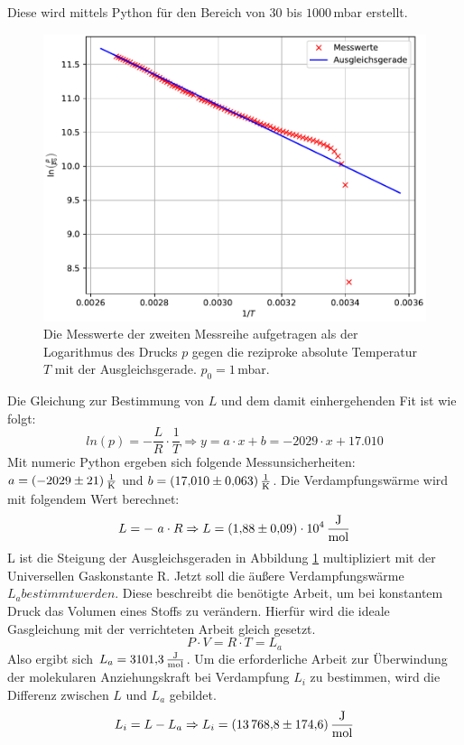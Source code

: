 Diese wird mittels Python für den Bereich von $30$ bis $1000$\,mbar erstellt. \\
\begin{figure}[H]
  \centering
  \includegraphics[scale=0.5]{plotc.pdf}
  \caption{Die Messwerte der zweiten Messreihe aufgetragen als der Logarithmus des Drucks $p$
  gegen die reziproke absolute Temperatur $T$ mit der Ausgleichsgerade. $p_0=1$\,mbar.}
  \label{fig:Ausgleichsgerade}
\end{figure}
\newpage
Die Gleichung zur Bestimmung von $L$ und dem damit einhergehenden Fit ist wie folgt:
\begin{equation}
  ln(p) = - \frac{L}{R} \cdot \frac{1}{T}
  \Rightarrow y = a \cdot x + b = -2029 \cdot x + 17.010
\end{equation}
Mit numeric Python ergeben sich folgende Messunsicherheiten: $a = \SI{-2029 \pm 21 }{\frac{1}{\kelvin}}$
und $b = \SI{17.010 \pm 0.063}{\frac{1}{\kelvin}}$.
Die Verdampfungswärme wird mit folgendem Wert berechnet:
\begin{equation*}
  L = - \ a \cdot R \Rightarrow L = \SI{1.88 +- 0.09e4}{\frac{\J}{\mol}}
\end{equation*}
L ist die Steigung der Ausgleichsgeraden in Abbildung \ref{fig:Ausgleichsgerade} multipliziert mit der Universellen Gaskonstante R.
\noindent
Jetzt soll die äußere Verdampfungswärme $L_a bestimmt werden$.
Diese beschreibt die benötigte Arbeit, um bei konstantem Druck das Volumen eines Stoffs zu verändern.
Hierfür wird die ideale Gasgleichung mit der verrichteten Arbeit gleich gesetzt.
\begin{equation}
    P \cdot V = R \cdot T = L_a
\end{equation}
Also ergibt sich $L_a = \SI{3101.3}{\frac{\J}{\mol}}$.
Um die erforderliche Arbeit zur Überwindung der molekularen Anziehungskraft bei Verdampfung $L_i$ zu bestimmen, wird
die Differenz zwischen $L$ und $L_a$ gebildet.
\begin{equation}
    L_i = L - L_a \Rightarrow L_i = \SI{13768.8 \pm 174.6}{\frac{\J}{\mol}}
\end{equation}

